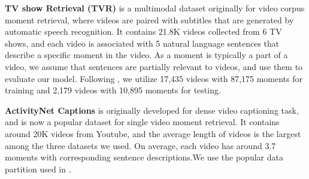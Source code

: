 \documentclass[sigconf]{acmart}
\begin{document}
\begin{table} [tb!]
\renewcommand{\arraystretch}{1.2}
\caption{Brief statistics of three public datasets used in our experiments.
The length is measured in seconds.}
\vspace{-4mm}
\label{tab:dataset_stat}
\centering 
{}\end{table}




\textbf{TV show Retrieval (TVR)} \cite{lei2020tvr} is a multimodal dataset originally for video corpus moment retrieval, where videos are paired with subtitles that are generated by automatic speech recognition.
It contains 21.8K videos collected from 6 TV shows, and each video is associated with 5 natural language sentences that describe a specific moment in the video. As a moment is typically a part of a video, we assume that sentences are partially relevant to videos, and use them to evaluate our model.
Following \cite{zhang2020hierarchical,zhang2021video}, we utilize 17,435 videos with 87,175 moments for training and 2,179 videos with 10,895 moments for testing. 



\textbf{ActivityNet Captions} \cite{krishna2017dense} is originally developed for dense video captioning task, and is now a popular dataset for single video moment retrieval.
It contains around 20K videos from Youtube, and the average length of videos is the largest among the three datasets we used. On average, each video has around 3.7 moments with corresponding sentence descriptions.We use the popular data partition used in \cite{zhang2020hierarchical, zhang2021video}. 
\end{document}
